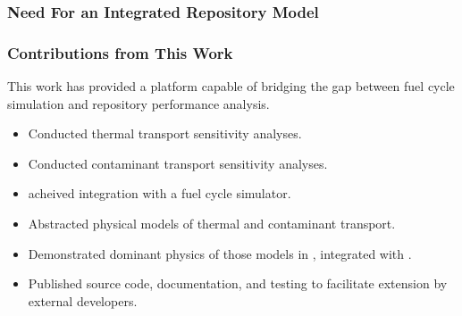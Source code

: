


\begin{frame}[ctb!]
  \frametitle{Need For an Integrated Repository Model}

  

\end{frame}

\begin{frame}[ctb!]
\frametitle{Contributions from This Work}

This work has provided a platform capable of bridging the gap between fuel cycle 
simulation and repository performance analysis.

  \begin{itemize}
  \item Conducted thermal transport sensitivity analyses. \cite{huff_numerical_2012, huff_benchmarking_2012}
  \item Conducted contaminant transport sensitivity analyses. \cite{huff_key_2012}
  \item \Cyder acheived integration with a fuel cycle simulator.
  \item Abstracted physical models of thermal and contaminant transport. \cite{huff_hydrologic_2013}
  \item Demonstrated dominant physics of those models in \Cyder, integrated 
  with \Cyclus. \cite{huff_dyanmic_2013, huff_cyclus_2013}
  \item Published source code, documentation, and testing to facilitate 
  extension by external developers. \cite{huff_cyder_2013}
  \end{itemize}
\end{frame}
